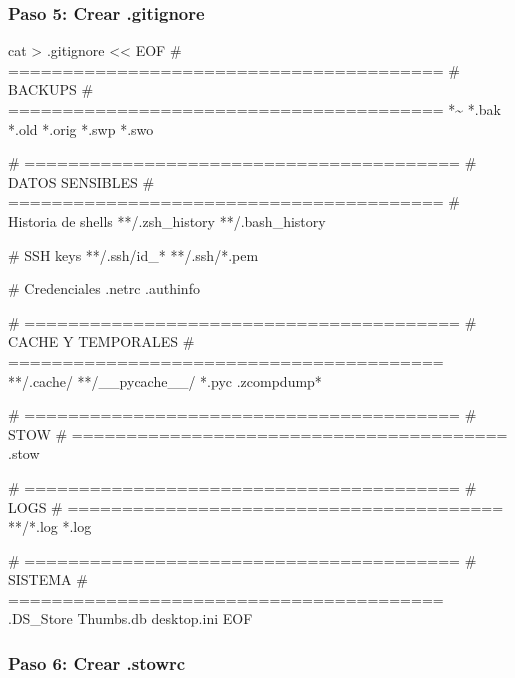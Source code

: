 \documentclass[
  doc,
  floatsintext,
  longtable,
  a4paper,
  nolmodern,
  notxfonts,
  notimes,
  12pt,
  colorlinks=true,linkcolor=blue,citecolor=blue,urlcolor=blue]{apa7}
\newenvironment{Shaded}{\begin{snugshade}}{\end{snugshade}}
\newcommand{\FunctionTok}[1]{\textcolor[rgb]{0.28,0.35,0.67}{#1}}
\newcommand{\NormalTok}[1]{\textcolor[rgb]{0.00,0.23,0.31}{#1}}
\newcommand{\OperatorTok}[1]{\textcolor[rgb]{0.37,0.37,0.37}{#1}}
\newcommand{\StringTok}[1]{\textcolor[rgb]{0.13,0.47,0.30}{#1}}
\begin{document}
\subsubsection{Paso 5: Crear .gitignore}\label{paso-5-crear-.gitignore}

\begin{Shaded}
\begin{Highlighting}[]
\FunctionTok{cat} \OperatorTok{\textgreater{}}\NormalTok{ .gitignore }\OperatorTok{\textless{}\textless{} \textquotesingle{}EOF\textquotesingle{}}
\StringTok{\# ========================================}
\StringTok{\# BACKUPS}
\StringTok{\# ========================================}
\StringTok{*\textasciitilde{}}
\StringTok{*.bak}
\StringTok{*.old}
\StringTok{*.orig}
\StringTok{*.swp}
\StringTok{*.swo}

\StringTok{\# ========================================}
\StringTok{\# DATOS SENSIBLES}
\StringTok{\# ========================================}
\StringTok{\# Historia de shells}
\StringTok{**/.zsh\_history}
\StringTok{**/.bash\_history}

\StringTok{\# SSH keys}
\StringTok{**/.ssh/id\_*}
\StringTok{**/.ssh/*.pem}

\StringTok{\# Credenciales}
\StringTok{.netrc}
\StringTok{.authinfo}

\StringTok{\# ========================================}
\StringTok{\# CACHE Y TEMPORALES}
\StringTok{\# ========================================}
\StringTok{**/.cache/}
\StringTok{**/\_\_pycache\_\_/}
\StringTok{*.pyc}
\StringTok{.zcompdump*}

\StringTok{\# ========================================}
\StringTok{\# STOW}
\StringTok{\# ========================================}
\StringTok{.stow}

\StringTok{\# ========================================}
\StringTok{\# LOGS}
\StringTok{\# ========================================}
\StringTok{**/*.log}
\StringTok{*.log}

\StringTok{\# ========================================}
\StringTok{\# SISTEMA}
\StringTok{\# ========================================}
\StringTok{.DS\_Store}
\StringTok{Thumbs.db}
\StringTok{desktop.ini}
\OperatorTok{EOF}
\end{Highlighting}
\end{Shaded}

\subsubsection{Paso 6: Crear .stowrc}\label{paso-6-crear-.stowrc}
\end{document}
